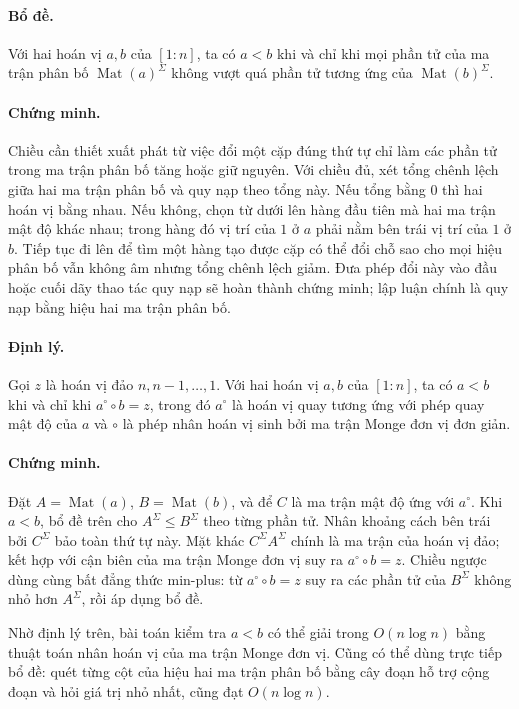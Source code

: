 \documentclass[11pt]{article}
\begin{document}
\paragraph{Bổ đề.}
Với hai hoán vị $a,b$ của $[1:n]$, ta có $a<b$ khi và chỉ khi mọi phần tử của
ma trận phân bố $\operatorname{Mat}(a)^\Sigma$ không vượt quá phần tử tương ứng
của $\operatorname{Mat}(b)^\Sigma$.

\paragraph{Chứng minh.}
Chiều cần thiết xuất phát từ việc đổi một cặp đúng thứ tự chỉ làm các phần tử
trong ma trận phân bố tăng hoặc giữ nguyên. Với chiều đủ, xét tổng chênh lệch
giữa hai ma trận phân bố và quy nạp theo tổng này. Nếu tổng bằng $0$ thì hai
hoán vị bằng nhau. Nếu không, chọn từ dưới lên hàng đầu tiên mà hai ma trận mật
độ khác nhau; trong hàng đó vị trí của $1$ ở $a$ phải nằm bên trái vị trí của
$1$ ở $b$. Tiếp tục đi lên để tìm một hàng tạo được cặp có thể đổi chỗ sao cho
mọi hiệu phân bố vẫn không âm nhưng tổng chênh lệch giảm. Đưa phép đổi này vào
đầu hoặc cuối dãy thao tác quy nạp sẽ hoàn thành chứng minh; lập luận chính là
quy nạp bằng hiệu hai ma trận phân bố.

\paragraph{Định lý.}
Gọi $z$ là hoán vị đảo $n,n-1,\ldots,1$. Với hai hoán vị $a,b$ của $[1:n]$,
ta có $a<b$ khi và chỉ khi $a^\circ\circ b=z$, trong đó $a^\circ$ là hoán vị quay
tương ứng với phép quay mật độ của $a$ và $\circ$ là phép nhân hoán vị sinh bởi
ma trận Monge đơn vị đơn giản.

\paragraph{Chứng minh.}
Đặt $A=\operatorname{Mat}(a)$, $B=\operatorname{Mat}(b)$, và để $C$ là ma trận
mật độ ứng với $a^\circ$. Khi $a<b$, bổ đề trên cho
$A^\Sigma\le B^\Sigma$ theo từng phần tử. Nhân khoảng cách bên trái bởi
$C^\Sigma$ bảo toàn thứ tự này. Mặt khác $C^\Sigma A^\Sigma$ chính là ma trận
của hoán vị đảo; kết hợp với cận biên của ma trận Monge đơn vị suy ra
$a^\circ\circ b=z$. Chiều ngược dùng cùng bất đẳng thức min-plus: từ
$a^\circ\circ b=z$ suy ra các phần tử của $B^\Sigma$ không nhỏ hơn
$A^\Sigma$, rồi áp dụng bổ đề.

Nhờ định lý trên, bài toán kiểm tra $a<b$ có thể giải trong $O(n\log n)$ bằng
thuật toán nhân hoán vị của ma trận Monge đơn vị. Cũng có thể dùng trực tiếp bổ
đề: quét từng cột của hiệu hai ma trận phân bố bằng cây đoạn hỗ trợ cộng đoạn và
hỏi giá trị nhỏ nhất, cũng đạt $O(n\log n)$.
\end{document}
